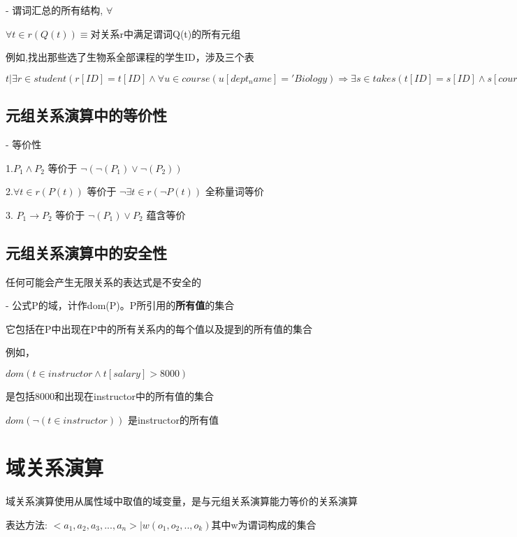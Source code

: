 \documentclass{article}        %
\begin{document}
- 谓词汇总的所有结构, $\forall$  

$ \forall t \in r(Q(t)) \equiv $对关系r中满足谓词Q(t)的所有元组 

例如,找出那些选了生物系全部课程的学生ID，涉及三个表 

$ t | \exists r \in student(r[ID] = t[ID] \wedge \forall u \in course(u[dept_name]='Biology) \Rightarrow \exists s \in takes(t[ID] = s[ID] \wedge s[course\_id]=u[course\_id])) $


\subsection{元组关系演算中的等价性}

- 等价性 

1.$P_1 \wedge P_2$ 等价于 $\neg(\neg(P_1)\vee \neg(P_2)) $ 

2.$\forall t \in r(P(t))$ 等价于 $\neg \exists t \in r(\neg P(t)) $  全称量词等价

3. $P_1 \rightarrow P_2$ 等价于 $\neg(P_1)\vee P_2 $ 蕴含等价 

\subsection{元组关系演算中的安全性}

任何可能会产生无限关系的表达式是不安全的 

- 公式P的域，计作dom(P)。P所引用的\textbf{所有值}的集合 

它包括在P中出现在P中的所有关系内的每个值以及提到的所有值的集合 

例如，

$ dom(t \in instructor \wedge t[salary]>8000) $ 

是包括8000和出现在instructor中的所有值的集合

$dom(\neg(t\in instructor)) $  是instructor的所有值

\section{域关系演算}

域关系演算使用从属性域中取值的域变量，是与元组关系演算能力等价的关系演算 

表达方法: ${<a_1,a_2,a_3,...,a_n>|w(o_1,o_2,..,o_k)}$其中w为谓词构成的集合
\end{document}
